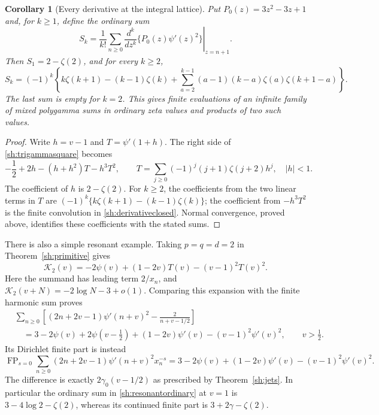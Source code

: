 \documentclass[11pt]{article}
\newtheorem{corollary}[theorem]{Corollary}
\theoremstyle{definition}
\theoremstyle{remark}
\numberwithin{equation}{section}
\begin{document}
\begin{corollary}[Every derivative at the integral lattice]\label{sh:allderivatives}
Put $P_0(z)=3z^2-3z+1$ and, for $k\ge1$, define the ordinary sum
\[
 S_k=\frac1{k!}\sum_{n\ge0}
     \left.\frac{d^k}{dz^k}\{P_0(z)\psi'(z)^2\}
                                  \right|_{z=n+1}.
\]
Then $S_1=2-\zeta(2)$, and for every $k\ge2$,
\begin{equation}\label{sh:derivativeclosed}
 \boxed{S_k=(-1)^k\left\{
      k\zeta(k+1)-(k-1)\zeta(k)
      +\sum_{a=2}^{k-1}(a-1)(k-a)
                     \zeta(a)\zeta(k+1-a)\right\}.}
\end{equation}
The last sum is empty for $k=2$.  This gives finite evaluations of
an infinite family of mixed polygamma sums in ordinary zeta values
and products of two such values.
\end{corollary}

\begin{proof}
Write $h=v-1$ and $T=\psi'(1+h)$.  The right side of
\eqref{sh:trigammasquare} becomes
\[
 -\frac12+2h-(h+h^2)T-h^3T^2,
 \qquad
 T=\sum_{j\ge0}(-1)^j(j+1)\zeta(j+2)h^j,
 \quad |h|<1.
\]
The coefficient of $h$ is $2-\zeta(2)$.  For $k\ge2$, the
coefficients from the two linear terms in $T$ are
$(-1)^k\{k\zeta(k+1)-(k-1)\zeta(k)\}$; the coefficient
from $-h^3T^2$ is the finite convolution in
\eqref{sh:derivativeclosed}.  Normal convergence, proved above,
identifies these coefficients with the stated sums.
\end{proof}

There is also a simple resonant example.  Taking $p=q=d=2$ in
Theorem~\ref{sh:primitive} gives
\[
 \mathcal K_2(v)=-2\psi(v)+(1-2v)T(v)-(v-1)^2T(v)^2.
\]
Here the summand has leading term $2/x_n$, and
$\mathcal K_2(v+N)=-2\log N-3+o(1)$.  Comparing this expansion
with the finite harmonic sum proves
\begin{equation}\label{sh:resonantordinary}
 \boxed{\begin{aligned}
 &\sum_{n\ge0}\left[
     (2n+2v-1)\psi'(n+v)^2-\frac2{n+v-1/2}\right]\\
 &\quad=3-2\psi(v)+2\psi(v-\tfrac12)
                 +(1-2v)\psi'(v)-(v-1)^2\psi'(v)^2,
 \qquad v>\tfrac12.
 \end{aligned}}
\end{equation}
Its Dirichlet finite part is instead
\begin{equation}\label{sh:resonantFP}
 \operatorname{FP}_{s=0}
   \sum_{n\ge0}(2n+2v-1)\psi'(n+v)^2x_n^{-s}
 =3-2\psi(v)+(1-2v)\psi'(v)-(v-1)^2\psi'(v)^2.
\end{equation}
The difference is exactly $2\gamma_0(v-1/2)$ as prescribed by
Theorem~\ref{sh:jets}.  In particular the ordinary sum in
\eqref{sh:resonantordinary} at $v=1$ is
$3-4\log2-\zeta(2)$, whereas its continued finite part is
$3+2\gamma-\zeta(2)$.
\end{document}
